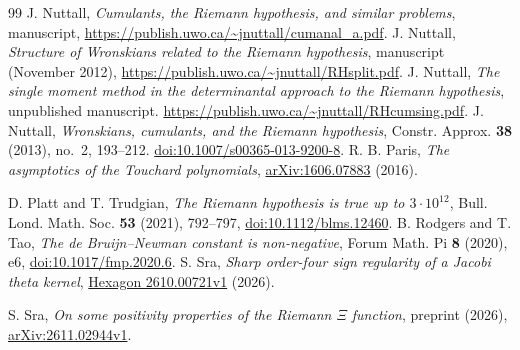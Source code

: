 \documentclass[11pt,a4paper,reqno]{amsart}
\numberwithin{equation}{section}
\begin{document}
\begin{thebibliography}{99}
 J. Nuttall, \emph{Cumulants, the Riemann hypothesis, and similar problems}, manuscript, \url{https://publish.uwo.ca/~jnuttall/cumanal_a.pdf}.
 J. Nuttall, \emph{Structure of Wronskians related to the Riemann hypothesis}, manuscript (November 2012), \url{https://publish.uwo.ca/~jnuttall/RHsplit.pdf}.
 J. Nuttall, \emph{The single moment method in the determinantal approach to the Riemann hypothesis}, unpublished manuscript.
\url{https://publish.uwo.ca/~jnuttall/RHcumsing.pdf}.
 J. Nuttall, \emph{Wronskians, cumulants, and the Riemann hypothesis},
Constr. Approx. \textbf{38} (2013), no.~2, 193--212.
\href{https://doi.org/10.1007/s00365-013-9200-8}{doi:10.1007/s00365-013-9200-8}.
 R. B. Paris, \emph{The asymptotics of the Touchard polynomials}, \href{https://arxiv.org/abs/1606.07883}{arXiv:1606.07883} (2016).

 D. Platt and T. Trudgian, \emph{The Riemann hypothesis is true up to \(3\cdot10^{12}\)}, Bull. Lond. Math. Soc. \textbf{53} (2021), 792--797, \href{https://doi.org/10.1112/blms.12460}{doi:10.1112/blms.12460}.
 B. Rodgers and T. Tao, \emph{The de Bruijn--Newman constant is non-negative}, Forum Math. Pi \textbf{8} (2020), e6, \href{https://doi.org/10.1017/fmp.2020.6}{doi:10.1017/fmp.2020.6}.
 S. Sra, \emph{Sharp order-four sign regularity of a Jacobi theta kernel}, \href{https://hexagonmath.org/pdf/2610.00721v1}{Hexagon 2610.00721v1} (2026).

 S. Sra, \emph{On some positivity properties of the Riemann \(\Xi\) function}, preprint (2026), \href{https://arxiv.org/abs/2611.02944v1}{arXiv:2611.02944v1}.
\end{thebibliography}
\end{document}
